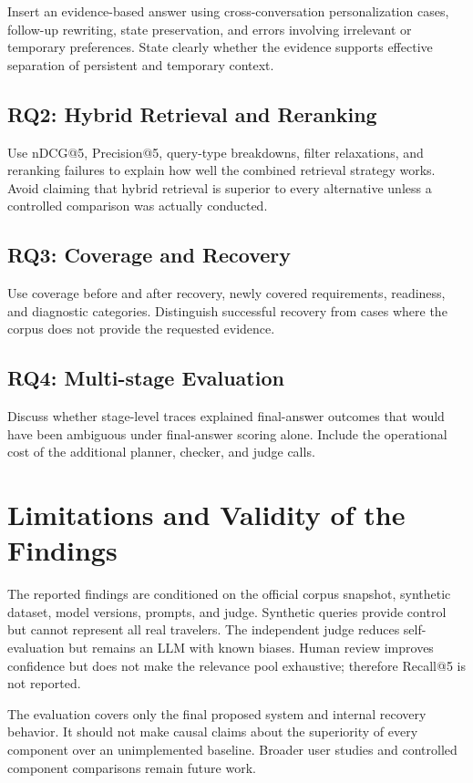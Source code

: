 Insert an evidence-based answer using cross-conversation personalization cases,
follow-up rewriting, state preservation, and errors involving irrelevant or
temporary preferences. State clearly whether the evidence supports effective
separation of persistent and temporary context.

\subsection{RQ2: Hybrid Retrieval and Reranking}

Use nDCG@5, Precision@5, query-type breakdowns, filter relaxations, and
reranking failures to explain how well the combined retrieval strategy works.
Avoid claiming that hybrid retrieval is superior to every alternative unless a
controlled comparison was actually conducted.

\subsection{RQ3: Coverage and Recovery}

Use coverage before and after recovery, newly covered requirements, readiness,
and diagnostic categories. Distinguish successful recovery from cases where
the corpus does not provide the requested evidence.

\subsection{RQ4: Multi-stage Evaluation}

Discuss whether stage-level traces explained final-answer outcomes that would
have been ambiguous under final-answer scoring alone. Include the operational
cost of the additional planner, checker, and judge calls.

\section{Limitations and Validity of the Findings}

The reported findings are conditioned on the official corpus snapshot,
synthetic dataset, model versions, prompts, and judge. Synthetic queries provide
control but cannot represent all real travelers. The independent judge reduces
self-evaluation but remains an LLM with known biases. Human review improves
confidence but does not make the relevance pool exhaustive; therefore Recall@5
is not reported.

The evaluation covers only the final proposed system and internal recovery
behavior. It should not make causal claims about the superiority of every
component over an unimplemented baseline. Broader user studies and controlled
component comparisons remain future work.

